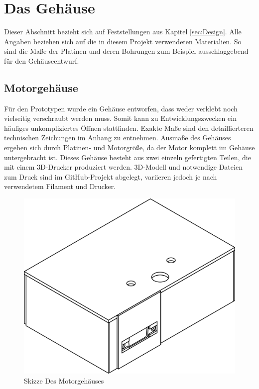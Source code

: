 \documentclass[11pt, titlepage, fleqn]{report}
\begin{document}
		\section{Das Gehäuse}
		\label{sec:Casing}
			Dieser Abschnitt bezieht sich auf Feststellungen aus Kapitel \ref{sec:Design}. Alle Angaben beziehen sich auf die in diesem Projekt verwendeten Materialien. So sind die Maße der Platinen und deren Bohrungen zum Beispiel ausschlaggebend für den Gehäuseentwurf. 
			\subsection{Motorgehäuse}
				Für den Prototypen wurde ein Gehäuse entworfen, dass weder verklebt noch vielseitig verschraubt werden muss. Somit kann zu Entwicklungszwecken ein häufiges unkompliziertes Öffnen stattfinden. Exakte Maße sind den detaillierteren technischen Zeichungen im Anhang zu entnehmen. Ausmaße des Gehäuses ergeben sich durch Platinen- und Motorgröße, da der Motor  komplett im Gehäuse untergebracht ist. Dieses Gehäuse besteht aus zwei einzeln gefertigten Teilen, die mit einem 3D-Drucker produziert werden. 3D-Modell und notwendige Dateien zum Druck sind im GitHub-Projekt abgelegt, variieren jedoch je nach verwendetem Filament und Drucker.
				\vspace{3em}
				\begin{figure}[htbp]
					\centering
					\includegraphics[width=0.75\linewidth]{./img/Motor_Case_Draw.png}
					\caption{Skizze Des Motorgehäuses
					\label{fig:imgMotorDraw}}			
				\end{figure}
			\newpage
\end{document}
